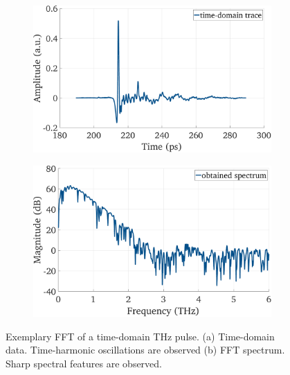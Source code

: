 \begin{figure}[!]
    \centering
    \begin{minipage}{\textwidth} 
        \centering
        \begin{subfigure}[t]{0.48\textwidth}
            \centering
            \includegraphics[height=0.235\textheight]{figures/FFT_time.pdf}
            \caption{\centering}
            \label{fgdhsjk}
        \end{subfigure}
        \hfill
        \begin{subfigure}[t]{0.48\textwidth}
            \centering
            \includegraphics[height=0.235\textheight]{figures/FFT_spectrum.pdf}
            \caption{\centering}
            \label{ghjkl}
        \end{subfigure}
        \caption{Exemplary FFT of a time-domain THz pulse. (a) Time-domain data. Time-harmonic oscillations are observed (b) FFT spectrum. Sharp spectral features are observed.}
        \label{fig:FFT}
    \end{minipage}
\end{figure}

